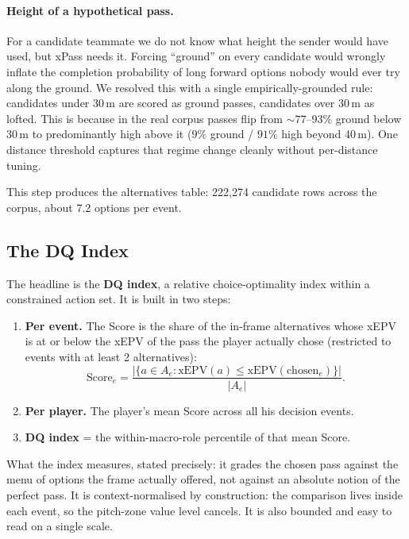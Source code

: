 \documentclass[12pt,a4paper]{article}
\begin{document}
\paragraph{Height of a hypothetical pass.}
For a candidate teammate we do not know what height the sender would have used, but xPass needs it.
Forcing ``ground'' on every candidate would wrongly inflate the completion probability of long forward options nobody would ever try along the ground.
We resolved this with a single empirically-grounded rule: candidates under 30\,m are scored as ground passes, candidates over 30\,m as lofted. This is because in the real corpus passes flip from ${\sim}77$--$93\%$ ground below 30\,m to predominantly high above it ($9\%$ ground / $91\%$ high beyond 40\,m).
One distance threshold captures that regime change cleanly without per-distance tuning.

This step produces the alternatives table: 222,274 candidate rows across the corpus, about 7.2 options per event.

\subsection{The DQ Index}\label{sec:dq-index}

The headline is the \textbf{DQ index}, a relative choice-optimality index within a constrained action set.
It is built in two steps:

\begin{enumerate}
    \item \textbf{Per event.} The Score is the share of the in-frame alternatives whose xEPV is at or below the xEPV of the pass the player actually chose (restricted to events with at least 2 alternatives):
    \begin{equation}\label{eq:dq-score}
        \text{Score}_e = \frac{|\{a \in A_e : \text{xEPV}(a) \leq \text{xEPV}(\text{chosen}_e)\}|}{|A_e|}.
    \end{equation}
    \item \textbf{Per player.} The player's mean Score across all his decision events.
    \item \textbf{DQ index} = the within-macro-role percentile of that mean Score.
\end{enumerate}

What the index measures, stated precisely: it grades the chosen pass against the menu of options the frame actually offered, not against an absolute notion of the perfect pass.
It is context-normalised by construction: the comparison lives inside each event, so the pitch-zone value level cancels. It is also bounded and easy to read on a single scale.
\end{document}
